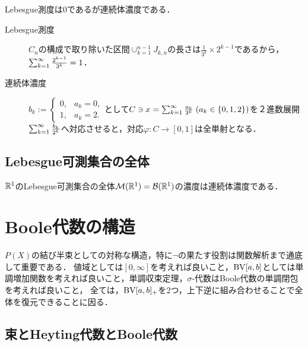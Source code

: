 \documentclass[uplatex, dvipdfmx]{jsreport}
\begin{document}
\begin{proposition}[サイズと長さとの概念の違い]
    Lebesgue測度は$0$であるが連続体濃度である．
\end{proposition}
\begin{Proof}\mbox{}
    \begin{description}
        \item[Lebesgue測度] $C_n$の構成で取り除いた区間$\cup_{k=1}^{n-1}J_{k,n}$の長さは$\frac{1}{3^k}\times 2^{k-1}$であるから，$\sum_{k=1}^\infty\frac{2^{k-1}}{3^k}=1$．
        \item[連続体濃度] $b_k:=\begin{cases}0,&a_k=0,\\1,&a_k=2.\end{cases}$として$C\ni x=\sum_{k=1}^\infty\frac{a_k}{3^k}\;(a_k\in\{0,1,2\})$を２進数展開$\sum_{k=1}^\infty\frac{b_k}{2^k}$へ対応させると，対応$\varphi:C\to[0,1]$は全単射となる．
    \end{description}
\end{Proof}

\subsection{Lebesgue可測集合の全体}

\begin{corollary}
    $\mathbb{R}^1$のLebesgue可測集合の全体$\mathcal{M}(\mathbb{R}^1)=\mathcal{B}(\mathbb{R}^1)$の濃度は連続体濃度である．
\end{corollary}

\section{Boole代数の構造}

\begin{tcolorbox}[colframe=ForestGreen, colback=ForestGreen!10!white,breakable,colbacktitle=ForestGreen!40!white,coltitle=black,fonttitle=\bfseries\sffamily,
title=解析学で最も大事な構造：完備Boole代数]
    $P(X)$の結び半束としての対称な構造，特に$\lnot$の果たす役割は関数解析まで通底して重要である．
    値域としては$[0,\infty]$を考えれば良いこと，$\mathrm{BV}[a,b]$としては単調増加関数を考えれば良いこと，単調収束定理，$\sigma$-代数はBoole代数の単調閉包を考えれば良いこと，
    全ては，$\mathrm{BV}[a,b]_+$を2つ，上下逆に組み合わせることで全体を復元できることに因る．
\end{tcolorbox}

\subsection{束とHeyting代数とBoole代数}
\end{document}
